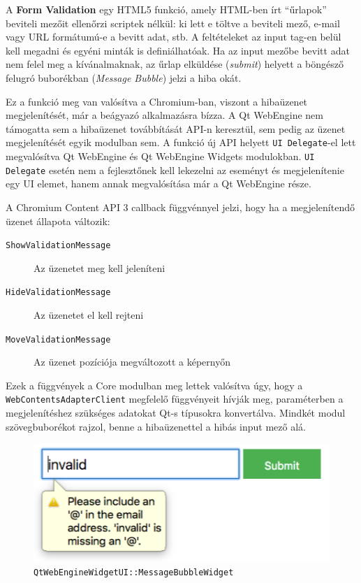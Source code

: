 \documentclass[12pt]{report}
\begin{document}
\noindent
A \textbf{Form Validation} egy HTML5 funkció, amely HTML-ben írt ``űrlapok'' beviteli
mezőit ellenőrzi scriptek nélkül: ki lett e töltve a beviteli mező, e-mail vagy URL
formátumú-e a bevitt adat, stb. A feltételeket az input tag-en belül kell megadni és
egyéni minták is definiálhatóak. Ha az input mezőbe bevitt adat nem felel meg a
kívánalmaknak, az űrlap elküldése (\textit{submit}) helyett a böngésző felugró buborékban
(\textit{Message Bubble}) jelzi a hiba okát.

Ez a funkció meg van valósítva a Chromium-ban, viszont a hibaüzenet megjelenítését, már
a beágyazó alkalmazásra bízza. A Qt WebEngine nem támogatta sem a hibaüzenet továbbítását
API-n keresztül, sem pedig az üzenet megjelenítését egyik modulban sem. A funkció új API
helyett \texttt{UI Delegate}-el lett megvalósítva Qt WebEngine és Qt WebEngine Widgets
modulokban. \texttt{UI Delegate} esetén nem a fejlesztőnek kell lekezelni az eseményt és
megjelenítenie egy UI elemet, hanem annak megvalósítása már a Qt WebEngine része.

A Chromium Content API 3 callback függvénnyel jelzi, hogy ha a megjelenítendő üzenet állapota
változik:
\begin{description}
    \item[\texttt{ShowValidationMessage}] Az üzenetet meg kell jeleníteni
    \item[\texttt{HideValidationMessage}] Az üzenetet el kell rejteni
    \item[\texttt{MoveValidationMessage}] Az üzenet pozíciója megváltozott a képernyőn
\end{description}
Ezek a függvények a Core modulban meg lettek valósítva úgy, hogy a \\
\texttt{WebContentsAdapterClient} megfelelő függvényeit hívják meg, paraméterben
a megjelenítéshez szükséges adatokat Qt-s típusokra konvertálva. Mindkét modul
szövegbuborékot rajzol, benne a hibaüzenettel a hibás input mező alá.

\begin{figure}[h]
    \centering
    \includegraphics[scale=0.75]{bubi-widget-screenshot}
    \caption{
        \label{fig:bubi-widget-screenshot}
        \texttt{QtWebEngineWidgetUI::MessageBubbleWidget}
    }
\end{figure}
\end{document}
